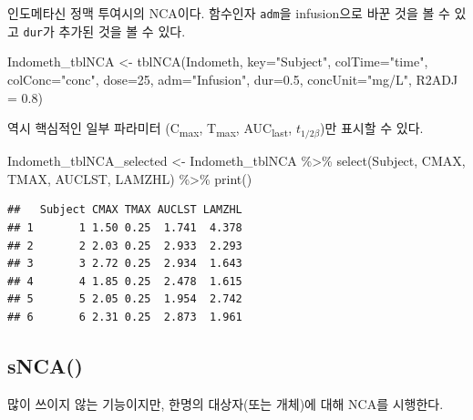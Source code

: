 \documentclass[
  11pt,
  krantz2, a4paper, twoside]{krantz}
\newenvironment{Shaded}{\begin{snugshade}}{\end{snugshade}}
\newcommand{\AttributeTok}[1]{\textcolor[rgb]{0.77,0.63,0.00}{#1}}
\newcommand{\DecValTok}[1]{\textcolor[rgb]{0.00,0.00,0.81}{#1}}
\newcommand{\FloatTok}[1]{\textcolor[rgb]{0.00,0.00,0.81}{#1}}
\newcommand{\FunctionTok}[1]{\textcolor[rgb]{0.00,0.00,0.00}{#1}}
\newcommand{\NormalTok}[1]{#1}
\newcommand{\OtherTok}[1]{\textcolor[rgb]{0.56,0.35,0.01}{#1}}
\newcommand{\SpecialCharTok}[1]{\textcolor[rgb]{0.00,0.00,0.00}{#1}}
\newcommand{\StringTok}[1]{\textcolor[rgb]{0.31,0.60,0.02}{#1}}
\theoremstyle{definition}
\theoremstyle{definition}
\theoremstyle{definition}
\theoremstyle{definition}
\theoremstyle{remark}
\begin{document}
인도메타신 정맥 투여시의 NCA이다. 함수인자 \texttt{adm}을 infusion으로 바꾼 것을 볼 수 있고 \texttt{dur}가 추가된 것을 볼 수 있다.

\begin{Shaded}
\begin{Highlighting}[]
\NormalTok{Indometh\_tblNCA }\OtherTok{\textless{}{-}} \FunctionTok{tblNCA}\NormalTok{(Indometh, }\AttributeTok{key=}\StringTok{"Subject"}\NormalTok{, }
                          \AttributeTok{colTime=}\StringTok{"time"}\NormalTok{, }\AttributeTok{colConc=}\StringTok{"conc"}\NormalTok{, }\AttributeTok{dose=}\DecValTok{25}\NormalTok{, }
                          \AttributeTok{adm=}\StringTok{"Infusion"}\NormalTok{, }\AttributeTok{dur=}\FloatTok{0.5}\NormalTok{, }
                          \AttributeTok{concUnit=}\StringTok{"mg/L"}\NormalTok{, }\AttributeTok{R2ADJ =} \FloatTok{0.8}\NormalTok{)}
\end{Highlighting}
\end{Shaded}

역시 핵심적인 일부 파라미터 (C\textsubscript{max}, T\textsubscript{max}, AUC\textsubscript{last}, \(t_{1/2\beta}\))만 표시할 수 있다.

\begin{Shaded}
\begin{Highlighting}[]
\NormalTok{Indometh\_tblNCA\_selected }\OtherTok{\textless{}{-}}\NormalTok{ Indometh\_tblNCA }\SpecialCharTok{\%\textgreater{}\%} 
  \FunctionTok{select}\NormalTok{(Subject, CMAX, TMAX, AUCLST, LAMZHL) }\SpecialCharTok{\%\textgreater{}\%} 
  \FunctionTok{print}\NormalTok{()}
\end{Highlighting}
\end{Shaded}

\begin{verbatim}
##   Subject CMAX TMAX AUCLST LAMZHL
## 1       1 1.50 0.25  1.741  4.378
## 2       2 2.03 0.25  2.933  2.293
## 3       3 2.72 0.25  2.934  1.643
## 4       4 1.85 0.25  2.478  1.615
## 5       5 2.05 0.25  1.954  2.742
## 6       6 2.31 0.25  2.873  1.961
\end{verbatim}

\hypertarget{snca}{%
\subsection{sNCA()}\label{snca}}

많이 쓰이지 않는 기능이지만, 한명의 대상자(또는 개체)에 대해 NCA를 시행한다.
\end{document}
